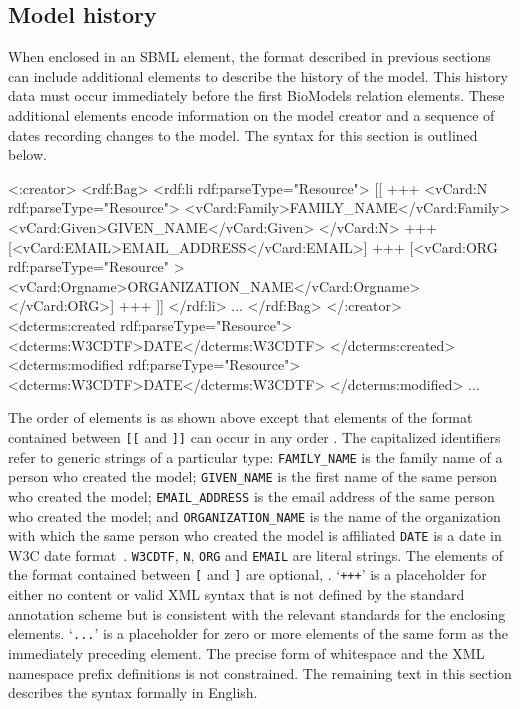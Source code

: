\subsection{Model history}
\label{sec:model-history-annotation}

When enclosed in an SBML \Model element, the format described in
previous sections can include additional elements to describe the
history of the model.  This history data must occur immediately
before the first BioModels relation elements.  These additional
elements encode information on the model creator and a sequence of
dates recording changes to the model. The syntax for this section
is outlined below.
 
\begin{example}
<:creator>
  <rdf:Bag>
    <rdf:li rdf:parseType="Resource">
      [[
      +++
      <vCard:N rdf:parseType="Resource">
        <vCard:Family>FAMILY_NAME</vCard:Family>
        <vCard:Given>GIVEN_NAME</vCard:Given>
      </vCard:N>
      +++
      [<vCard:EMAIL>EMAIL_ADDRESS</vCard:EMAIL>]
      +++
      [<vCard:ORG rdf:parseType="Resource" >
        <vCard:Orgname>ORGANIZATION_NAME</vCard:Orgname>
      </vCard:ORG>]
      +++
      ]]
    </rdf:li>
    ...
  </rdf:Bag>
</:creator>
<dcterms:created rdf:parseType="Resource">
  <dcterms:W3CDTF>DATE</dcterms:W3CDTF>
</dcterms:created>
<dcterms:modified rdf:parseType="Resource">
  <dcterms:W3CDTF>DATE</dcterms:W3CDTF>
</dcterms:modified>
...
\end{example}

The order of elements is as shown above except that elements of
the format contained between \texttt{[[} and \texttt{]]} can occur
in any order .  The capitalized identifiers refer to generic
strings of a particular type: \texttt{FAMILY\_NAME} is the family
name of a person who created the model; \texttt{GIVEN\_NAME} is
the first name of the same person who created the model;
\texttt{EMAIL\_ADDRESS} is the email address of the same person
who created the model; and \texttt{ORGANIZATION\_NAME} is the name
of the organization with which the same person who created the
model is affiliated \texttt{DATE} is a date in W3C date
format~\citep{wolf:1998}. \texttt{W3CDTF}, \texttt{N},
\texttt{ORG} and \texttt{EMAIL} are literal strings. The elements
of the format contained between \texttt{[} and \texttt{]}  are
optional, . `\texttt{+++}' is a placeholder for either no content or
valid XML syntax that is not defined by the standard annotation
scheme but is consistent with the relevant standards for the
enclosing elements. `\texttt{...}' is a placeholder for zero or
more elements of the same form as the immediately preceding
element. The precise form of whitespace and the XML namespace
prefix definitions is not constrained.  The remaining text in this
section describes the syntax formally in English.

